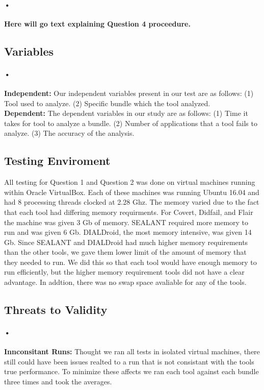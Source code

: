 \documentclass[twocolumn]{article}
\begin{document}
\paragraph{•}
	\textbf{Here will go text explaining Question 4 proceedure.}

\subsection{Variables}
\paragraph{•}
	\textbf{Independent:} Our independent variables present in our test are as follows: (1) Tool used to analyze. (2) Specific bundle which the tool analyzed.\\
	\textbf{Dependent:} The dependent variables in our study are as follows: (1) Time it takes for tool to analyze a bundle. (2) Number of applications that a tool fails to analyze. (3) The accuracy of the analysis.
	
\subsection{Testing Enviroment}
	All testing for Question 1 and Question 2 was done on virtual machines running within Oracle VirtualBox. Each of these machines was running Ubuntu 16.04 and had 8 processing threads clocked at 2.28 Ghz. The memory varied due to the fact that each tool had differing memory requirments. For Covert, Didfail, and Flair the machine was given 3 Gb of memory. SEALANT required more memory to run and was given 6 Gb. DIALDroid, the most memory intensive, was given 14 Gb. Since SEALANT and DIALDroid had much higher memory requirements than the other tools, we gave them lower limit of the amount of memory that they needed to run. We did this so that each tool would have enough memory to run efficiently, but the higher memory requirement tools did not have a clear advantage. In addtion, there was no swap space avaliable for any of the tools.
	
\subsection{Threats to Validity}
\paragraph{•}
	\textbf{Innconsitant Runs:} Thought we ran all tests in isolated virtual machines, there still could have been issues realted to a run that is not consistant with the tools true performance. To minimize these affects we ran each tool against each bundle three times and took the averages.
\end{document}

